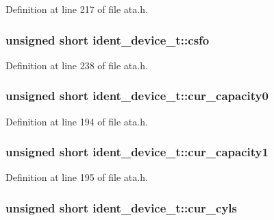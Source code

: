 Definition at line 217 of file ata.\+h.

\subsubsection[{\texorpdfstring{csfo}{csfo}}]{\setlength{\rightskip}{0pt plus 5cm}unsigned short ident\+\_\+device\+\_\+t\+::csfo}\hypertarget{structident__device__t_aadfa929967cf77a8dd7338516b3b39b4}{}\label{structident__device__t_aadfa929967cf77a8dd7338516b3b39b4}


Definition at line 238 of file ata.\+h.

\subsubsection[{\texorpdfstring{cur\+\_\+capacity0}{cur_capacity0}}]{\setlength{\rightskip}{0pt plus 5cm}unsigned short ident\+\_\+device\+\_\+t\+::cur\+\_\+capacity0}\hypertarget{structident__device__t_a15f93e46e5a465a66e1116bb4ebacd44}{}\label{structident__device__t_a15f93e46e5a465a66e1116bb4ebacd44}


Definition at line 194 of file ata.\+h.

\subsubsection[{\texorpdfstring{cur\+\_\+capacity1}{cur_capacity1}}]{\setlength{\rightskip}{0pt plus 5cm}unsigned short ident\+\_\+device\+\_\+t\+::cur\+\_\+capacity1}\hypertarget{structident__device__t_ae60fada7975afcb92375bd112a7103ad}{}\label{structident__device__t_ae60fada7975afcb92375bd112a7103ad}


Definition at line 195 of file ata.\+h.

\subsubsection[{\texorpdfstring{cur\+\_\+cyls}{cur_cyls}}]{\setlength{\rightskip}{0pt plus 5cm}unsigned short ident\+\_\+device\+\_\+t\+::cur\+\_\+cyls}\hypertarget{structident__device__t_a5d2e9e636ff4e9fa7b73d52411c94e9c}{}\label{structident__device__t_a5d2e9e636ff4e9fa7b73d52411c94e9c}



